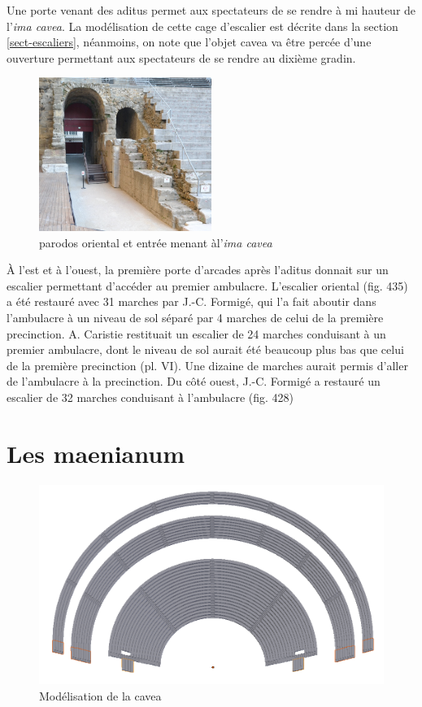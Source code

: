 Une porte venant des aditus permet aux spectateurs de se rendre à mi hauteur de l'\textit{ima cavea}. La modélisation de cette cage d'escalier est décrite dans la section \ref{sect-escaliers}, néanmoins, on note que l'objet cavea va être percée d'une ouverture permettant aux spectateurs de se rendre au dixième gradin.


\begin{figure}[!h]
	\centering
	\includegraphics[width=0.5\textwidth]{images/parodos}
	\caption[\Gls{parodos} oriental et entrée menant àl'\textit{ima cavea}]{\Gls{parodos} oriental et entrée menant àl'\textit{ima cavea} \cite[fig. 418]{orangeTxt}} 
	\label{parodos} 
\end{figure}

\`{A} l'est et à l'ouest, la première porte d'arcades après l'\gls{aditus} donnait sur un escalier permettant d'accéder au premier \gls{ambulacre}. L'escalier oriental (fig. 435) a été restauré avec 31 marches par J.-C. Formigé, qui l'a fait aboutir dans l'ambulacre à un niveau de sol séparé par 4 marches de celui de la première precinction. A. Caristie restituait un escalier de 24 marches conduisant à un premier ambulacre, dont le niveau de sol aurait été beaucoup plus bas que celui de la première precinction (pl. VI). Une dizaine de
marches aurait permis d'aller de l'ambulacre à la precinction.
Du côté ouest, J.-C. Formigé a restauré un escalier de 32 marches conduisant à
l'ambulacre (fig. 428)


		\section{Les maenianum} \label{sect-maenianum}

\begin{figure}[!h]
	\includegraphics[width=\linewidth]{images/modMaenianum}
	\caption{Modélisation de la \gls{cavea}} 
	\label{modCavea} 
\end{figure} 

